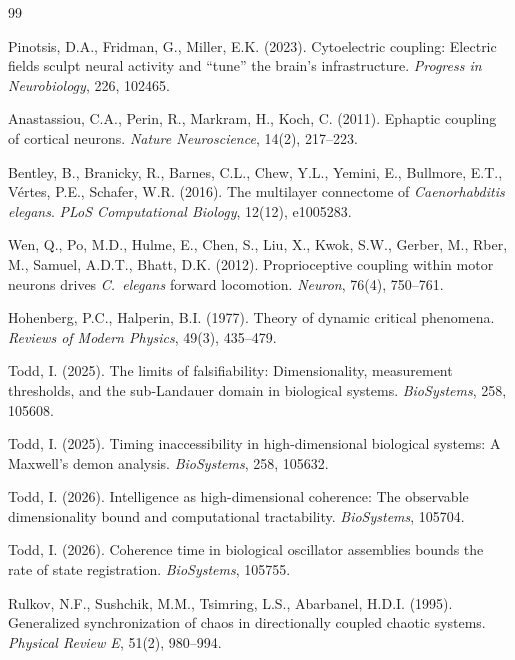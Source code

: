 \documentclass[12pt]{article}
\begin{document}
\begin{thebibliography}{99}

Pinotsis, D.A., Fridman, G., Miller, E.K. (2023). Cytoelectric coupling: Electric fields sculpt neural activity and ``tune'' the brain's infrastructure. \textit{Progress in Neurobiology}, 226, 102465.

Anastassiou, C.A., Perin, R., Markram, H., Koch, C. (2011). Ephaptic coupling of cortical neurons. \textit{Nature Neuroscience}, 14(2), 217--223.

Bentley, B., Branicky, R., Barnes, C.L., Chew, Y.L., Yemini, E., Bullmore, E.T., V\'ertes, P.E., Schafer, W.R. (2016). The multilayer connectome of \textit{Caenorhabditis elegans}. \textit{PLoS Computational Biology}, 12(12), e1005283.

Wen, Q., Po, M.D., Hulme, E., Chen, S., Liu, X., Kwok, S.W., Gerber, M., Rber, M., Samuel, A.D.T., Bhatt, D.K. (2012). Proprioceptive coupling within motor neurons drives \textit{C.~elegans} forward locomotion. \textit{Neuron}, 76(4), 750--761.


Hohenberg, P.C., Halperin, B.I. (1977). Theory of dynamic critical phenomena. \textit{Reviews of Modern Physics}, 49(3), 435--479.


Todd, I. (2025). The limits of falsifiability: Dimensionality, measurement thresholds, and the sub-Landauer domain in biological systems. \textit{BioSystems}, 258, 105608.

Todd, I. (2025). Timing inaccessibility in high-dimensional biological systems: A Maxwell's demon analysis. \textit{BioSystems}, 258, 105632.

Todd, I. (2026). Intelligence as high-dimensional coherence: The observable dimensionality bound and computational tractability. \textit{BioSystems}, 105704.

Todd, I. (2026). Coherence time in biological oscillator assemblies bounds the rate of state registration. \textit{BioSystems}, 105755.


Rulkov, N.F., Sushchik, M.M., Tsimring, L.S., Abarbanel, H.D.I. (1995). Generalized synchronization of chaos in directionally coupled chaotic systems. \textit{Physical Review E}, 51(2), 980--994.


\end{thebibliography}
\end{document}
